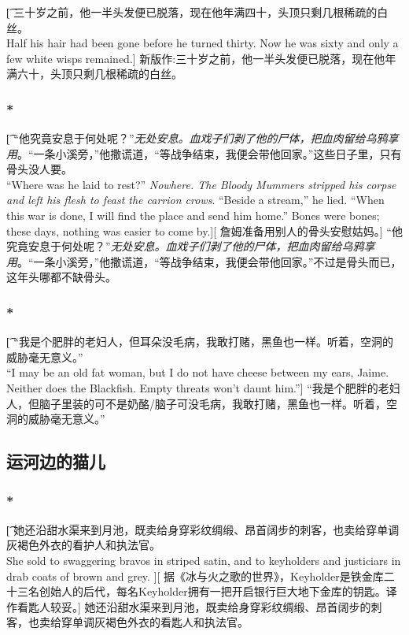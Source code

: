 \documentclass[12pt,a4paper]{article}
\begin{document}
\subsubsection{}\t[
	三十岁之前，他一半头发便已脱落，现在他年满四十，头顶只剩几根稀疏的白丝。\\
	Half his hair had been gone before he turned thirty. Now he was sixty and only a few white wisps remained.]
	新版作:三十岁之前，他一半头发便已脱落，现在他年满六十，头顶只剩几根稀疏的白丝。
	
\subsubsection{\color{red}*}\t[
	“他究竟安息于何处呢？”\emph{无处安息。血戏子们剥了他的尸体，把血肉留给乌鸦享用}。“一条小溪旁，”他撒谎道，“等战争结束，我便会带他回家。”这些日子里，只有骨头没人要。\\
	“Where was he laid to rest?” \emph{Nowhere. The Bloody Mummers stripped his corpse and left his flesh to feast the carrion crows}. “Beside a stream,” he lied. “When this war is done, I will find the place and send him home.” Bones were bones; these days, nothing was easier to come by.][
	詹姆准备用别人的骨头安慰姑妈。]
	“他究竟安息于何处呢？”\emph{无处安息。血戏子们剥了他的尸体，把血肉留给乌鸦享用}。“一条小溪旁，”他撒谎道，“等战争结束，我便会带他回家。”不过是骨头而已，这年头哪都不缺骨头。
	
\subsubsection{\color{red}*}\t[
	“我是个肥胖的老妇人，但耳朵没毛病，我敢打赌，黑鱼也一样。听着，空洞的威胁毫无意义。”\\
	“I may be an old fat woman, but I do not have cheese between my ears, Jaime. Neither does the Blackfish. Empty threats won't daunt him.”]
	“我是个肥胖的老妇人，但脑子里装的可不是奶酪/脑子可没毛病，我敢打赌，黑鱼也一样。听着，空洞的威胁毫无意义。”
		 
\subsection{运河边的猫儿}
\subsubsection{\color{red}*}\t[
	她还沿甜水渠来到月池，既卖给身穿彩纹绸缎、昂首阔步的刺客，也卖给穿单调灰褐色外衣的看护人和执法官。\\
	She sold to swaggering bravos in striped satin, and to keyholders and justiciars in drab coats of brown and grey. ][
	据《冰与火之歌的世界》，Keyholder是铁金库二十三名创始人的后代，每名Keyholder拥有一把开启银行巨大地下金库的钥匙。译作看匙人较妥。]
	她还沿甜水渠来到月池，既卖给身穿彩纹绸缎、昂首阔步的刺客，也卖给穿单调灰褐色外衣的看匙人和执法官。
	
\end{document}
